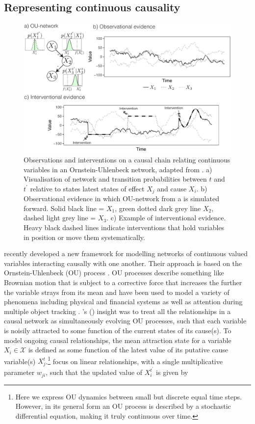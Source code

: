 \documentclass{cambridge7A}%
\def\citeapos#1{\citeauthor{#1}'s (\citeyear{#1})}
\begin{document}
\subsection{Representing continuous causality}

\begin{figure}[t]
   \centering
   \includegraphics[width = \columnwidth]{OU_bw}
   \caption{Observations and interventions on a causal chain relating continuous variables in an Ornstein-Uhlenbeck network, adapted from \cite{davis2018ctcv}.    a) Visualisation of network and transition probabilities between $t$ and $t^{\prime}$ relative to states latest states of effect $X_j$ and cause $X_i$. b) Observational evidence in which OU-network from a is simulated forward.  Solid  black line = $X_1$, green dotted dark grey line $X_2$, dashed light grey line = $X_3$. c) Example of interventional evidence.  Heavy black dashed lines indicate interventions that hold variables in position or move them systematically.}
   \label{fig:OU}
\end{figure}

\cite{davis2018ctcv} recently developed a new framework for modelling networks of continuous valued variables interacting causally with one another.  Their approach is based on the Ornstein-Uhlenbeck (OU) process \citep{uhlenbeck1930theory}.  
OU processes describe something like Brownian motion that is subject to a corrective force that increases the further the variable strays from its mean and  
have been used to model a variety of phenomena including physical \citep{lacko2012planning} and financial \citep{barndorff2001non} systems as well as attention during multiple object tracking \citep{vul2009explaining}.  \citeapos{davis2018ctcv} insight was to treat all the relationships in a causal network as simultaneously evolving OU processes, such that each variable is noisily attracted to some function of the current states of its cause(s).    
To model ongoing causal relationships, the mean attraction state for a variable $X_i\in\mathcal{X}$ is defined as some function of the latest value of its putative cause variable(s) $X^t_j$.\footnote{Here we express OU dynamics between small but discrete equal time steps.  However, in its general form an OU process is described by a stochastic differential equation, making it truly continuous over time.}  \cite{davis2018ctcv} focus on linear relationships, with a single multiplicative parameter $w_{ji}$, such that the updated value of $X_i^{t^{\prime}}$ is given by
\end{document}
